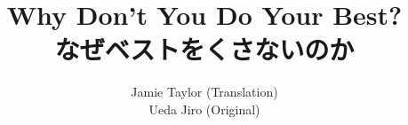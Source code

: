 \documentclass[11pt, a4paper, twoside]{report}
\begin{document}
\begin{CJK}{UTF8}{min}

\title{Why Don't You Do Your Best?\\なぜベストをくさないのか}
\author{Jamie Taylor (Translation)\\ Ueda Jiro (Original)}
\maketitle




\tableofcontents




\end{CJK}
\end{document}
